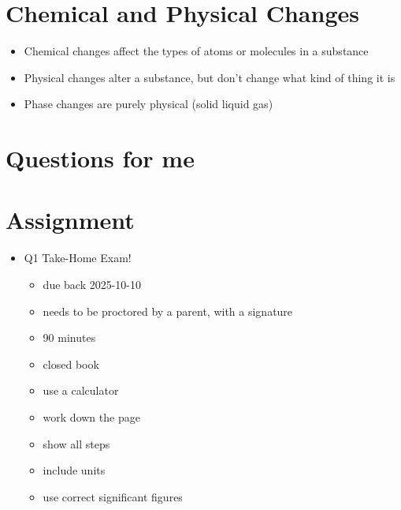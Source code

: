 \documentclass[10pt, oneside]{article}   	%
\begin{document}
\section*{Chemical and Physical Changes}
\begin{itemize}
\item Chemical changes affect the types of atoms or molecules in a substance
\item Physical changes alter a substance, but don't change what kind of thing it is
\item Phase changes are purely physical (solid \ce{<=>} liquid \ce{<=>} gas)
\end{itemize}

\section*{Questions for me}

\section*{Assignment}
\begin{itemize}
\item Q1 Take-Home Exam!
\begin{itemize}
\item due back 2025-10-10
\item needs to be proctored by a parent, with a signature
\item 90 minutes
\item closed book
\item use a calculator
\item work down the page
\item show all steps
\item include units
\item use correct significant figures
\end{itemize}
\end{itemize}
\end{document}
